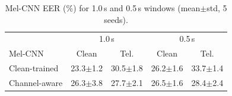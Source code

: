\begin{table}[htbp]
\caption{Mel-CNN EER (\%) for 1.0\,s and 0.5\,s windows (mean$\pm$std, 5 seeds).}
\begin{center}
\footnotesize\setlength{\tabcolsep}{3pt}
\begin{tabular}{lcccc}
\toprule
& \multicolumn{2}{c}{1.0\,s} & \multicolumn{2}{c}{0.5\,s} \\
Mel-CNN & Clean & Tel. & Clean & Tel. \\
\midrule
Clean-trained & 23.3$\pm$1.2 & 30.5$\pm$1.8 & 26.2$\pm$1.6 & 33.7$\pm$1.4 \\
Channel-aware & 26.3$\pm$3.8 & 27.7$\pm$2.1 & 26.5$\pm$1.6 & 28.4$\pm$2.4 \\
\bottomrule
\end{tabular}
\label{tab:window}
\end{center}
\end{table}
